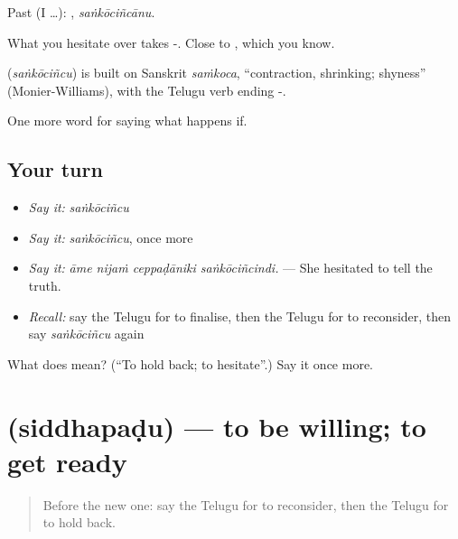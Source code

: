 Past (I …): , \emph{saṅkōciñcānu}.

What you hesitate over takes -. Close to , which you know.

\begin{cousinweb}
\textbf{} (\emph{saṅkōciñcu}) is built on Sanskrit \emph{saṁkoca}, \textquotedblleft{}contraction, shrinking; shyness\textquotedblright{} (Monier-Williams), with the Telugu verb ending -.
\end{cousinweb}

\begin{grammarlens}[title={What you've built}]
One more word for saying what happens if.
\end{grammarlens}

\subsection*{Your turn}
\begin{itemize}
\raggedright
  \item \emph{Say it:} \emph{saṅkōciñcu}
  \item \emph{Say it:} \emph{saṅkōciñcu}, once more
  \item \emph{Say it:} \emph{āme nijaṁ ceppaḍāniki saṅkōciñcindi.} — She hesitated to tell the truth.
  \item \emph{Recall:} say the Telugu for to finalise, then the Telugu for to reconsider, then say \emph{saṅkōciñcu} again
\end{itemize}

\begin{tcolorbox}[breakable,colback=teal!4,colframe=teal!35!black,title={Before you move on}]
What does  mean? (\textquotedblleft{}To hold back; to hesitate\textquotedblright{}.) Say it once more.
\end{tcolorbox}
\section[\texorpdfstring{\te{సిద్ధపడు} (siddhapaḍu)}{సిద్ధపడు (siddhapaḍu)}]{ (siddhapaḍu) — to be willing; to get ready}

\label{lesson:TE-C426-siddhapadu}



\begin{quote}
Before the new one: say the Telugu for to reconsider, then the Telugu for to hold back.
\end{quote}

